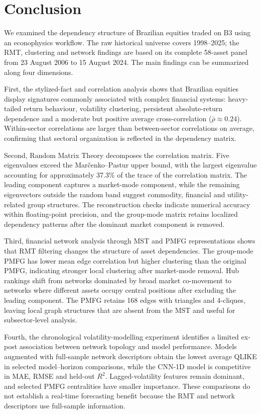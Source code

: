 \section{Conclusion}
\label{sec:conclusion}

We examined the dependency structure of Brazilian equities traded on B3 using an econophysics workflow. The raw historical universe covers 1998--2025; the RMT, clustering and network findings are based on its complete 58-asset panel from 23 August 2006 to 15 August 2024. The main findings can be summarized along four dimensions.

First, the stylized-fact and correlation analysis shows that Brazilian equities display signatures commonly associated with complex financial systems: heavy-tailed return behaviour, volatility clustering, persistent absolute-return dependence and a moderate but positive average cross-correlation ($\bar{\rho}\approx0.24$). Within-sector correlations are larger than between-sector correlations on average, confirming that sectoral organization is reflected in the dependency matrix.

Second, Random Matrix Theory decomposes the correlation matrix. Five eigenvalues exceed the Mar\v{c}enko--Pastur upper bound, with the largest eigenvalue accounting for approximately 37.3\% of the trace of the correlation matrix. The leading component captures a market-mode component, while the remaining eigenvectors outside the random band suggest commodity, financial and utility-related group structures. The reconstruction checks indicate numerical accuracy within floating-point precision, and the group-mode matrix retains localized dependency patterns after the dominant market component is removed.

Third, financial network analysis through MST and PMFG representations shows that RMT filtering changes the structure of asset dependencies. The group-mode PMFG has lower mean edge correlation but higher clustering than the original PMFG, indicating stronger local clustering after market-mode removal. Hub rankings shift from networks dominated by broad market co-movement to networks where different assets occupy central positions after excluding the leading component. The PMFG retains 168 edges with triangles and 4-cliques, leaving local graph structures that are absent from the MST and useful for subsector-level analysis.

Fourth, the chronological volatility-modelling experiment identifies a limited ex-post association between network topology and model performance. Models augmented with full-sample network descriptors obtain the lowest average QLIKE in selected model--horizon comparisons, while the CNN-1D model is competitive in MAE, RMSE and held-out $R^2$. Lagged-volatility features remain dominant, and selected PMFG centralities have smaller importance. These comparisons do not establish a real-time forecasting benefit because the RMT and network descriptors use full-sample information.

